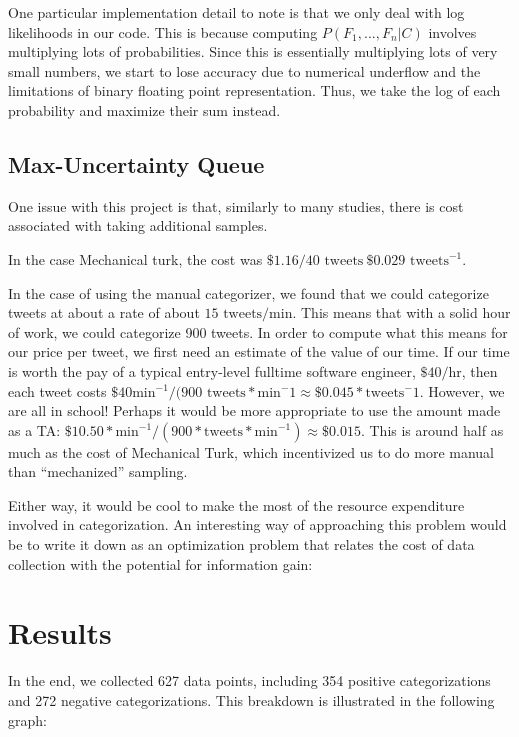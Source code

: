\documentclass[12pt,a4paper]{article}
\begin{document}
One particular implementation detail to note is that we only deal with log likelihoods in our code. This is because computing $P(F_1, ..., F_n | C)$ involves multiplying lots of probabilities. Since this is essentially multiplying lots of very small numbers, we start to lose accuracy due to numerical underflow and the limitations of binary floating point representation. Thus, we take the log of each probability and maximize their sum instead.

\subsection { Max-Uncertainty Queue }

One issue with this project is that, similarly to many studies, there is cost associated with taking additional samples.

In the case Mechanical turk, the cost was $ \$1.16 / 40 \text{ tweets} ~ \$0.029 \text{ tweets}^{-1}$. 


In the case of using the manual categorizer, we found that we could categorize tweets at about a rate of about $ 15 \text{ tweets} / \text{min} $.  This means that with a solid hour of work, we could categorize 900 tweets.  In order to compute what this means for our price per tweet, we first need an estimate of the value of our time.  If our time is worth the pay of a typical entry-level fulltime software engineer, $ \$40 / \text{hr} $, then each tweet costs $ \$40 \text{min}^{-1} / ( 900 \text{ tweets} * \text{min}^-1 \approx \$0.045 * \text{tweets}^-1 $.  However, we are all in school!  Perhaps it would be more appropriate to use the amount made as a TA: $ \$10.50 * \text{min}^{-1} / ( 900 * \text{tweets} * \text{min}^{-1} ) \approx \$0.015 $.  This is around half as much as the cost of Mechanical Turk, which incentivized us to do more manual than ``mechanized'' sampling.

Either way, it would be cool to make the most of the resource expenditure involved in categorization.  An interesting way of approaching this problem would be to write it down as an optimization problem that relates the cost of data collection with the potential for information gain:

\section { Results }

In the end, we collected 627 data points, including 354 positive categorizations and 272 negative categorizations. This breakdown is illustrated in the following graph:
\end{document}
